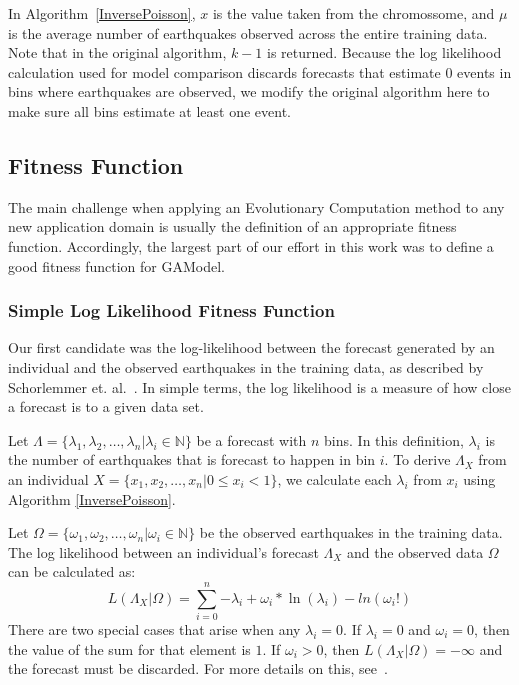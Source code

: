 \documentclass{sig-alternate}
\begin{document}
In Algorithm~\ref{InversePoisson}, $x$ is the value taken from the
chromossome, and $\mu$ is the average number of earthquakes observed
across the entire training data. Note that in the original algorithm,
$k-1$ is returned. Because the log likelihood calculation used for
model comparison discards forecasts that estimate $0$ events in bins
where earthquakes are observed, we modify the original algorithm here
to make sure all bins estimate at least one event.


\subsection{Fitness Function}

The main challenge when applying an Evolutionary Computation method to
any new application domain is usually the definition of an appropriate
fitness function. Accordingly, the largest part of our effort in this
work was to define a good fitness function for GAModel.

\subsubsection{Simple Log Likelihood Fitness Function} %

Our first candidate was the log-likelihood between the forecast
generated by an individual and the observed earthquakes in the
training data, as described by Schorlemmer
et. al.~\cite{Schorlemmer2007}. In simple terms, the log likelihood is
a measure of how close a forecast is to a given data set.

Let $\Lambda = \{\lambda_1, \lambda_2, \dots, \lambda_n | \lambda_i
\in \mathbb{N}\}$ be a forecast with $n$ bins. In this definition,
$\lambda_i$ is the number of earthquakes that is forecast to happen in
bin $i$. To derive $\Lambda_X$ from an individual $X = \{x_1, x_2,
\dots, x_n | 0 \leq x_i < 1\}$, we calculate each $\lambda_i$ from
$x_i$ using Algorithm \ref{InversePoisson}.

Let $\Omega = \{\omega_1, \omega_2, \dots, \omega_n | \omega_i \in
\mathbb{N}\}$ be the observed earthquakes in the training data. The
log likelihood between an individual's forecast $\Lambda_X$ and the
observed data $\Omega$ can be calculated as:
\begin{equation}
  L(\Lambda_X|\Omega) = \sum_{i=0}^n {-\lambda_i +
    \omega_i*\ln(\lambda_i)-ln(\omega_i!)}
\end{equation}
There are two special cases that arise when any $\lambda_i = 0$. If
$\lambda_i = 0$ and $\omega_i = 0$, then the value of the sum for that
element is $1$. If $\omega_i > 0$, then $L(\Lambda_X|\Omega) =
-\infty$ and the forecast must be discarded. For more details on
this, see~\cite{Schorlemmer2007}.
\end{document}
